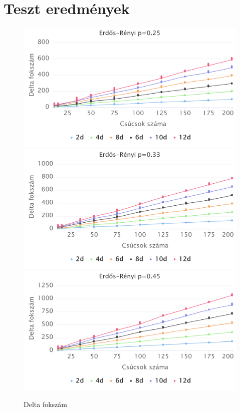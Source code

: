 \documentclass[12pt]{report}
\begin{document}
\chapter{Teszt eredmények}

\begin{figure}[h]
	\begin{center}
		\includegraphics[width=0.49\linewidth]{pictures/constant_dan_ratio25_delta.png}
		\includegraphics[width=0.49\linewidth]{pictures/constant_dan_ratio33_delta.png}		
		\includegraphics[width=0.49\linewidth]{pictures/constant_dan_ratio45_delta.png}
		\caption{Delta fokszám}
	\end{center}
\end{figure}
\end{document}
